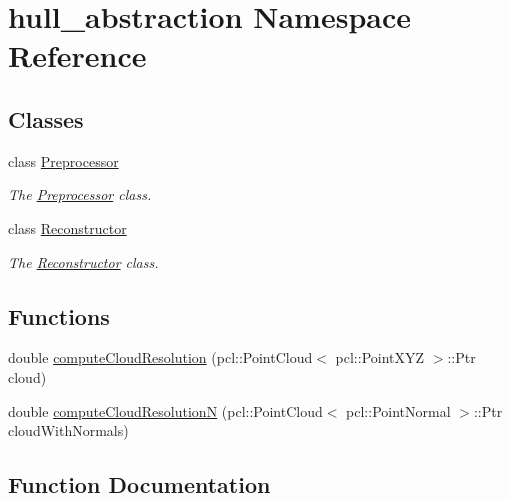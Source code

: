 \hypertarget{namespacehull__abstraction}{}\section{hull\+\_\+abstraction Namespace Reference}
\label{namespacehull__abstraction}
\subsection*{Classes}
\begin{DoxyCompactItemize}
\item 
class \hyperlink{classhull__abstraction_1_1_preprocessor}{Preprocessor}
\begin{DoxyCompactList}\small\item\em The \hyperlink{classhull__abstraction_1_1_preprocessor}{Preprocessor} class. \end{DoxyCompactList}\item 
class \hyperlink{classhull__abstraction_1_1_reconstructor}{Reconstructor}
\begin{DoxyCompactList}\small\item\em The \hyperlink{classhull__abstraction_1_1_reconstructor}{Reconstructor} class. \end{DoxyCompactList}\end{DoxyCompactItemize}
\subsection*{Functions}
\begin{DoxyCompactItemize}
\item 
double \hyperlink{namespacehull__abstraction_aee513dfed72060d83ec57c5909c9640e}{compute\+Cloud\+Resolution} (pcl\+::\+Point\+Cloud$<$ pcl\+::\+Point\+X\+YZ $>$\+::Ptr cloud)
\item 
double \hyperlink{namespacehull__abstraction_af42d720ef8e6155d54b04ad4c7982ad5}{compute\+Cloud\+ResolutionN} (pcl\+::\+Point\+Cloud$<$ pcl\+::\+Point\+Normal $>$\+::Ptr cloud\+With\+Normals)
\end{DoxyCompactItemize}


\subsection{Function Documentation}
